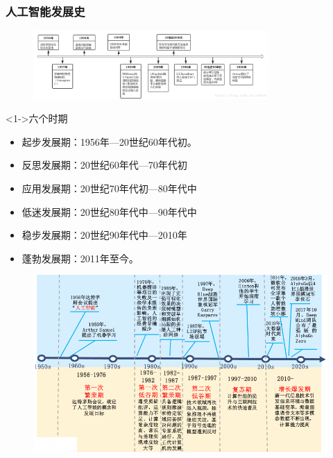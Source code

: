 \documentclass[10pt,aspectratio=43,mathserif,table]{beamer}
\begin{document}
\begin{frame}[allowframebreaks]
	\frametitle{人工智能发展史}
	\begin{figure}[htbp]
		\centering
		\includegraphics[width=0.8\textwidth]{figures/ailicheng.png}
	\end{figure}
	\begin{block}<1->{六个时期}
		\begin{itemize}
			\item<1->起步发展期：1956年—20世纪60年代初。
			\item<1-> 反思发展期：20世纪60年代—70年代初
			\item<1-> 应用发展期：20世纪70年代初—80年代中
			\item<1-> 低迷发展期：20世纪80年代中—90年代中
			\item<1-> 稳步发展期：20世纪90年代中—2010年
			\item<1-> 蓬勃发展期：2011年至今。
		\end{itemize}
	\end{block}
	\framebreak
	\begin{figure}
		\centering
		\includegraphics[width=0.9\paperwidth]{figures/licheng2.jpg}
	  \end{figure}
\end{frame}
\end{document}
